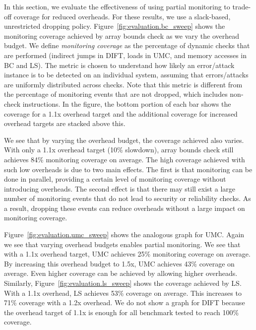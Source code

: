 In this section, we evaluate the effectiveness of
using partial monitoring to trade-off coverage for reduced overheads.
For these results, we use a slack-based, unrestricted dropping policy.
Figure~\ref{fig:evaluation.bc_sweep} shows the monitoring coverage achieved by
array bounds check as we vary the overhead budget. 
We define \emph{monitoring coverage} as the 
percentage of dynamic checks that are performed 
(indirect jumps in DIFT, loads in UMC, and memory accesses in BC and LS). 
The metric is chosen to understand
how likely an error/attack instance is to be detected on an individual system, 
assuming that errors/attacks are uniformly distributed across checks. 
Note that this metric is different from the
percentage of monitoring events that are not dropped, which includes
non-check instructions.
In the figure, the bottom portion of each
bar shows the coverage for a 1.1x overhead target and the additional
coverage for increased overhead targets are stacked above this.

We see that by varying the overhead budget, the coverage achieved also varies.
With only a 1.1x overhead target (10\% slowdown), array bounds check still
achieves 84\% monitoring coverage on average. The high coverage
achieved with such low overheads is due to two main effects.  The first is that
monitoring can be done in parallel, providing a certain level of monitoring coverage without
introducing overheads. The second effect is that there may still exist a large number of
monitoring events that do not lead to security or reliability checks. As a
result, dropping these events can reduce overheads without a large impact on
monitoring coverage.

Figure~\ref{fig:evaluation.umc_sweep} shows the analogous graph for UMC. Again
we see that varying overhead budgets enables partial monitoring. We see that
with a 1.1x overhead target, UMC achieves 25\% monitoring coverage on average.
By increasing this overhead budget to 1.5x, UMC achieves 43\% coverage on
average. Even higher coverage can be achieved by allowing higher overheads.
Similarly, Figure~\ref{fig:evaluation.ls_sweep} shows the coverage achieved by LS.
With a 1.1x overhead, LS achieves 53\% coverage on average. This increases to
71\% coverage with a 1.2x overhead. 
We do not show a graph for DIFT because the overhead target of 1.1x is enough for
all benchmark tested to reach 100\% coverage.

